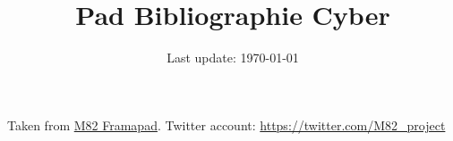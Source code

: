 \documentclass[12pt,a4paper]{article}
\author{Last update: \today}
\title{Pad Bibliographie Cyber}
\date{}
\begin{document}
\maketitle
\thispagestyle{empty}
Taken from \href{https://github.com/M82-project/Bibliography}{M82 Framapad}. Twitter account: \url{https://twitter.com/M82_project}\nocite{*}
\renewcommand{\thepage}{}


\end{document}
